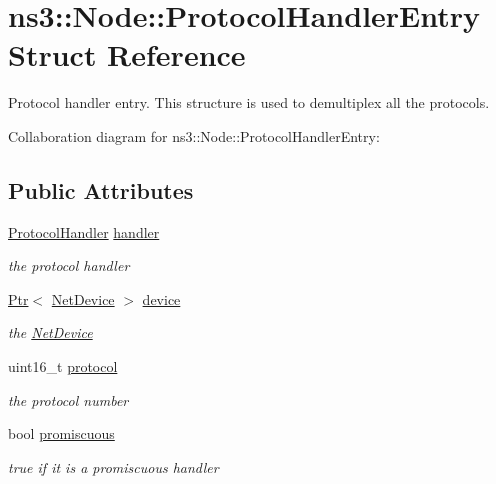 \hypertarget{structns3_1_1Node_1_1ProtocolHandlerEntry}{}\section{ns3\+:\+:Node\+:\+:Protocol\+Handler\+Entry Struct Reference}
\label{structns3_1_1Node_1_1ProtocolHandlerEntry}


Protocol handler entry. This structure is used to demultiplex all the protocols.  




Collaboration diagram for ns3\+:\+:Node\+:\+:Protocol\+Handler\+Entry\+:
\subsection*{Public Attributes}
\begin{DoxyCompactItemize}
\item 
\hyperlink{classns3_1_1Node_a4ce20b9442f89703d242ce3a3fa3dbf2}{Protocol\+Handler} \hyperlink{structns3_1_1Node_1_1ProtocolHandlerEntry_a954976c90430c990716a78f0ed1c0ce6}{handler}
\begin{DoxyCompactList}\small\item\em the protocol handler \end{DoxyCompactList}\item 
\hyperlink{classns3_1_1Ptr}{Ptr}$<$ \hyperlink{classns3_1_1NetDevice}{Net\+Device} $>$ \hyperlink{structns3_1_1Node_1_1ProtocolHandlerEntry_a7e963acf05dc4dec486049a6b13c8bbb}{device}
\begin{DoxyCompactList}\small\item\em the \hyperlink{classns3_1_1NetDevice}{Net\+Device} \end{DoxyCompactList}\item 
uint16\+\_\+t \hyperlink{structns3_1_1Node_1_1ProtocolHandlerEntry_a15aa93b69f35fe872e74fdfa88760723}{protocol}
\begin{DoxyCompactList}\small\item\em the protocol number \end{DoxyCompactList}\item 
bool \hyperlink{structns3_1_1Node_1_1ProtocolHandlerEntry_a0ce7e76b4105d29f2248bfd9b33620cc}{promiscuous}
\begin{DoxyCompactList}\small\item\em true if it is a promiscuous handler \end{DoxyCompactList}\end{DoxyCompactItemize}


